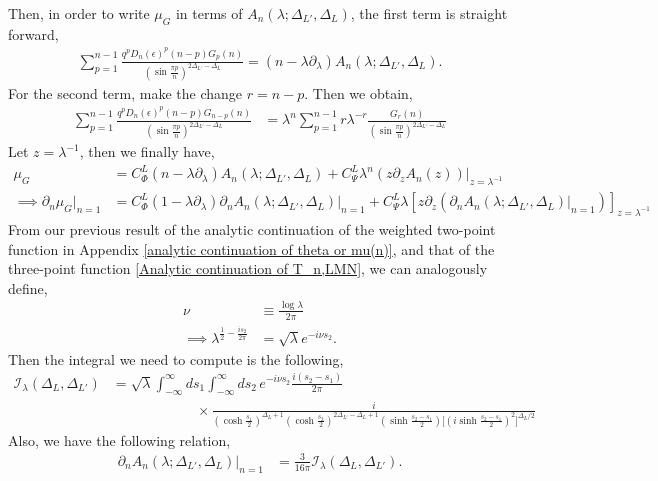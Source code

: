 \documentclass[11pt]{article}
\newcommand{\ep}{\epsilon}
\newcommand{\p}{\partial}
\newcommand{\nn}{\nonumber}
\newcommand{\lb}{\left(}
\newcommand{\rb}{\right)}
\begin{document}
Then, in order to write $\mu_G$ in terms of $A_n(\lambda;\Delta_{L'},\Delta_L)$, the first term is straight forward,
\begin{align}
    \sum_{p=1}^{n-1} \frac{q^p D_n(\ep)^p(n-p)G_p(n)}{\lb\sin \frac{\pi p}{n}\rb^{2\Delta_{L'}-\Delta_L}} =\lb n-\lambda \p_\lambda\rb A_n(\lambda;\Delta_{L'},\Delta_L).
\end{align}
For the second term, make the change $r = n-p$. Then we obtain,
\begin{align}
    \sum_{p=1}^{n-1} \frac{q^p D_n(\ep)^p(n-p)G_{n-p}(n)}{\lb\sin \frac{\pi p}{n}\rb^{2\Delta_{L'}-\Delta_L}} &= \lambda^n\sum_{p=1}^{n-1} r\lambda^{-r} \frac{G_r(n)}{\lb\sin \frac{\pi p}{n}\rb^{2\Delta_{L'}-\Delta_L}}
\end{align}
Let $z = \lambda^{-1}$, then we finally have,
\begin{align}
    \mu_G &= C_\Phi^L\lb n-\lambda \p_\lambda\rb A_n(\lambda;\Delta_{L'},\Delta_L) + C_\Psi^L \lambda^n \lb z\p_z A_n(z)\rb|_{z = \lambda^{-1}} \\
    \implies \p_n \mu_G |_{n=1}&= C_\Phi^L(1-\lambda \p_\lambda)\p_nA_n(\lambda;\Delta_{L'},\Delta_L)|_{n=1} + C_\Psi^L \lambda [z\p_z \lb  \p_nA_n(\lambda;\Delta_{L'},\Delta_L)|_{n=1}\rb]_{z=\lambda^{-1}}
\end{align}
From our previous result of the analytic continuation of the weighted two-point function in Appendix \ref{analytic continuation of theta or mu(n)}, and that of the three-point function \ref{Analytic continuation of T_n,LMN}, we can analogously define, 
\begin{align}
    \nu &\equiv \frac{\log \lambda}{2\pi} \\
    \implies  \lambda^{\frac{1}{2} - \frac{is_2}{2\pi}} &= \sqrt \lambda e^{-i\nu s_2} .
\end{align}
Then the integral we need to compute is the following,
\begin{align}
    \mathcal{I}_\lambda(\Delta_L,\Delta_{L'}) &= \sqrt \lambda \int_{-\infty}^{\infty}ds_1 \int_{-\infty}^{\infty} ds_2 \, e^{-i\nu s_2} \frac{i(s_2-s_1)}{2\pi} \nn\\
    &\qquad\qquad\qquad\times\frac{i}{\lb\cosh\frac{s_1}{2}\rb^{\Delta_L+1}\lb\cosh\frac{s_2}{2}\rb^{2\Delta_{L'}-\Delta_L+1}\lb\sinh\frac{s_2-s_1}{2}\rb\Big[\lb i\sinh\frac{s_2 - s_1}{2}\rb^2\Big]^{\Delta_L/2}}
\end{align}
Also, we have the following relation,
\begin{align}\label{eq: relation of A_n and I_lamnbda}
    \p_nA_n(\lambda;\Delta_{L'},\Delta_L)|_{n=1}&=\frac{3}{16\pi}\mathcal{I}_\lambda(\Delta_L,\Delta_{L'}).
\end{align}
\end{document}
